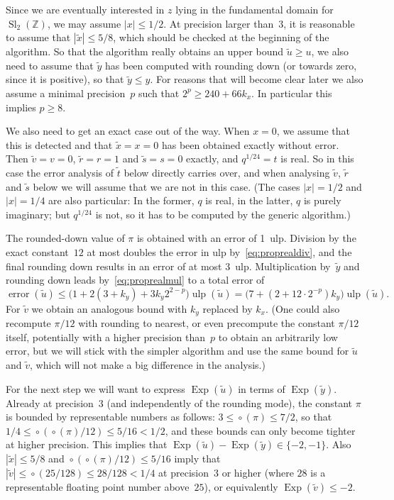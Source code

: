 \documentclass [11pt]{article}
\newcommand {\appro}[1]{\widetilde {#1}}
\newcommand {\ulp}[1]{#1~ulp}
\newcommand {\Ulp}{{\operatorname {ulp}}}
\DeclareMathOperator{\Exp}{\operatorname {Exp}}
\newcommand{\error}{\operatorname {error}}
\newcommand {\round}{\operatorname {\circ}}
\newcommand {\Z}{\mathbb Z}
\renewcommand {\leq}{\leqslant}
\renewcommand {\geq}{\geqslant}
\newcommand {\Sl}{\operatorname{Sl}}
\begin{document}
Since we are eventually interested in $z$ lying in the fundamental domain
for $\Sl_2 (\Z)$, we may assume $|x| \leq 1/2$.
At precision larger than~$3$, it is reasonable to assume that
$|\appro x| \leq 5/8$, which should be checked at the beginning of the
algorithm.
So that the algorithm really obtains an upper bound
$\appro u \geq u$, we also need to assume that $\appro y$ has been
computed with rounding down (or towards zero, since it is positive),
so that $\appro y \leq y$.
For reasons that will become clear later we also assume a minimal
precision~$p$ such that $2^p \geq 240 + 66 k_x$.
In particular this implies $p \geq 8$.

We also need to get an exact case out of the way.
When $x = 0$, we assume that this is detected and that $\appro x = x = 0$
has been obtained exactly without error.
Then $\appro v = v = 0$, $\appro r = r = 1$ and $\appro s = s = 0$
exactly, and $q^{1/24} = t$ is real.
So in this case the error analysis of $\appro t$ below directly carries
over, and when analysing $\appro v$, $\appro r$ and $\appro s$ below
we will assume that we are not in this case.
(The cases $|x| = 1/2$ and $|x| = 1/4$ are also particular: In the former,
$q$ is real, in the latter, $q$ is purely imaginary; but
$q^{1/24}$ is not, so it has to be computed by the generic algorithm.)

The rounded-down value of $\pi$ is obtained with an error of \ulp{1}.
Division by the exact constant~$12$ at most doubles the error in ulp
by~\eqref {eq:proprealdiv}, and the final rounding down results in an
error of at most \ulp{3}. Multiplication by~$\appro y$ and rounding down
leads by~\eqref {eq:proprealmul} to a total error of
\[
\error (\appro u)
\leq \big( 1 + 2 (3 + k_y) + 3 k_y 2^{2-p} \big) \Ulp (\appro u)
=    \big( 7 + (2 + 12 \cdot 2^{-p}) k_y \big) \Ulp (\appro u).
\]
For $\appro v$ we obtain an analogous bound with $k_y$ replaced by $k_x$.
(One could also recompute $\pi / 12$ with rounding to nearest,
or even precompute the constant $\pi / 12$ itself, potentially
with a higher precision than~$p$ to obtain an arbitrarily low error,
but we will stick with the simpler algorithm and use the same bound
for $\appro u$ and $\appro v$, which will not make a big difference in
the analysis.)

For the next step we will want to express $\Exp (\appro u)$ in terms of
$\Exp (\appro y)$. Already at precision~$3$ (and independently of the
rounding mode), the constant $\pi$ is bounded by representable numbers
as follows:
$3 \leq \round (\pi) \leq 7/2$, so that
$1/4 \leq \round (\round (\pi) / 12) \leq 5/16 < 1/2$,
and these bounds can only become tighter at higher precision.
This implies that
$\Exp (\appro u) - \Exp (\appro y) \in \{ -2, -1 \}$.
Also $|\appro x| \leq 5/8$ and $\round (\round (\pi) / 12) \leq 5/16$
imply that $|\appro v| \leq \round (25/128) \leq 28/128 < 1/4$
at precision~$3$ or higher (where $28$ is a representable floating point
number above~$25$), or equivalently $\Exp (\appro v) \leq -2$.
\end{document}
